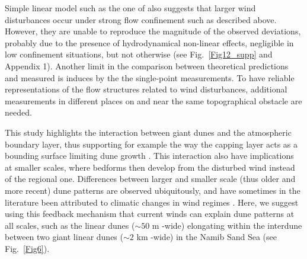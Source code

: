  Simple linear model such as the one of \citet{andreotti2009} also suggests that larger wind disturbances occur under strong flow confinement such as described above. However, they are unable to reproduce the magnitude of the observed deviations, probably due to the presence of hydrodynamical non-linear effects, negligible in low confinement situations, but not otherwise (see Fig.~\ref{Fig12_supp} and Appendix 1). Another limit in the comparison between theoretical predictions and measured is induces by the the single-point measurements. To have reliable representations of the flow structures related to wind disturbances, additional measurements in different places on and near the same topographical obstacle are needed.

 This study highlights the interaction between giant dunes and the atmospheric boundary layer, thus supporting for example the way the capping layer acts as a bounding surface limiting dune growth \citep{andreotti2009, gunn2021}. This interaction also have implications at smaller scales, where bedforms then develop from the disturbed wind instead of the regional one. Differences between larger and smaller scale (thus older and more recent) dune patterns are observed ubiquitously, and have sometimes in the literature been attributed to climatic changes in wind regimes \citep{refs}. Here, we suggest using this feedback mechanism that current winds can explain dune patterns at all scales, such as the linear dunes ($\sim 50$ m -wide) elongating within the interdune between two giant linear dunes ($\sim 2$ km -wide) in the Namib Sand Sea (see Fig.~\ref{Fig6}).


